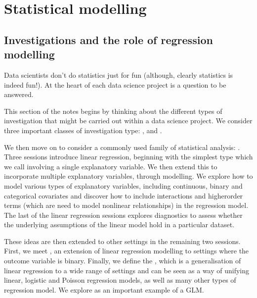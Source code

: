 \documentclass[letterpaper,10pt,english]{jupyterBook}
\begin{document}
\part{Statistical modelling}


\chapter{Investigations and the role of regression modelling}
\label{\detokenize{11. Investigation.Intro:investigations-and-the-role-of-regression-modelling}}\label{\detokenize{11. Investigation.Intro::doc}}
\sphinxAtStartPar
Data scientists don’t do statistics just for fun (although, clearly statistics is indeed fun!).  At the heart of each data science project is a question to be answered.

\sphinxAtStartPar
This section of the notes begins by thinking about the different types of investigation that might be carried out within a data science project. We consider three important classes of investigation type: ,  and .

\sphinxAtStartPar
We then move on to consider a commonly used family of statistical analysis: .  Three sessions introduce linear regression, beginning with the simplest type which we call  involving a single explanatory variable. We then extend this to incorporate multiple explanatory variables, through  modelling. We explore how to model various types of explanatory variables, including continuous, binary and categorical covariates and discover how to include interactions and higher\sphinxhyphen{}order terms (which are need to model non\sphinxhyphen{}linear relationships) in the regression model. The last of the linear regression sessions explores diagnostics to assess whether the underlying assumptions of the linear model hold in a particular dataset.

\sphinxAtStartPar
These ideas are then extended to other settings in the remaining two sessions. First, we meet , an extension of linear regression modelling to settings where the outcome variable is binary. Finally, we define the , which is a generalisation of linear regression to a wide range of settings and can be seen as a way of unifying linear, logistic and Poisson regression models, as well as many other types of regression model. We explore  as an important example of a GLM.
\end{document}
